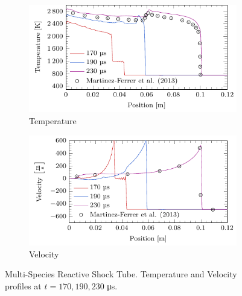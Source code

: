 \begin{figure}
    \begin{subfigure}[b]{0.5\textwidth}
        \centering
        \includegraphics[width=\textwidth]{figures/1D_reactive_shocktube/T.pdf}
        \caption{Temperature}
    \end{subfigure}
    \begin{subfigure}[b]{0.5\textwidth}
        \centering
        \includegraphics[width=\textwidth]{figures/1D_reactive_shocktube/u.pdf}
        \caption{Velocity}
    \end{subfigure}
    \caption{Multi-Species Reactive Shock Tube. Temperature and Velocity profiles at $t=170,190,230$ \si{\micro\second}.}
    \label{fig:1D_reactive_shocktube_T_u}
\end{figure}

